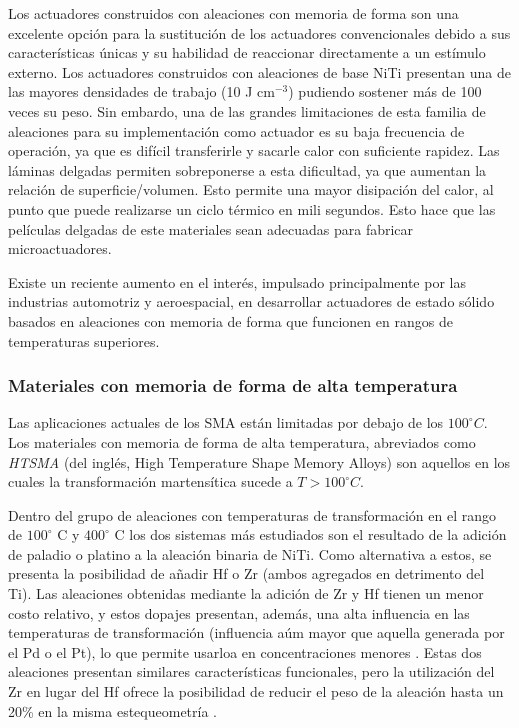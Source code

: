 \documentclass[12pt]{article}
\theoremstyle{definition}
\theoremstyle{remark}
\begin{document}
Los actuadores construidos con aleaciones con memoria de forma son una excelente opción para la sustitución de los actuadores convencionales debido a sus características únicas y su habilidad de reaccionar directamente a un estímulo externo. Los actuadores construidos con aleaciones de base NiTi presentan una de las mayores densidades de trabajo (10 J cm$^{-3}$) pudiendo sostener más de 100 veces su peso. Sin embardo, una de las grandes limitaciones de esta familia de aleaciones para su implementación como actuador es su baja frecuencia de operación, ya que es difícil transferirle y sacarle calor con suficiente rapidez. Las láminas delgadas permiten sobreponerse a esta dificultad, ya que aumentan la relación de superficie/volumen. Esto permite una mayor disipación del calor, al punto que puede realizarse un ciclo térmico en mili segundos. Esto hace que las películas delgadas de este materiales sean adecuadas para fabricar microactuadores\citep{ThinFilm}.

Existe un reciente aumento en el interés, impulsado principalmente por las industrias automotriz y aeroespacial, en desarrollar actuadores de estado sólido basados en aleaciones con memoria de forma que funcionen en rangos de temperaturas superiores.

\subsubsection{Materiales con memoria de forma de alta temperatura}

Las aplicaciones actuales de los SMA están limitadas por debajo de los $100^\circ C$. Los materiales con memoria de forma de alta temperatura, abreviados como \textit{HTSMA} (del inglés, High Temperature Shape Memory Alloys) son aquellos en los cuales la transformación martensítica sucede a $T > 100^\circ C$.

Dentro del grupo de aleaciones con temperaturas de transformación en el rango de $100^\circ$ C y $400^\circ$ C los dos sistemas más estudiados son el resultado de la adición de paladio o platino a la aleación binaria de NiTi. Como alternativa a estos, se presenta la posibilidad de añadir Hf o Zr (ambos agregados en detrimento del Ti)\cite{HTSMA}. Las aleaciones obtenidas mediante la adición de Zr y Hf tienen un menor costo relativo, y estos dopajes presentan, además, una alta influencia en las temperaturas de transformación (influencia aúm mayor que aquella generada por el Pd o el Pt), lo que permite usarloa en concentraciones menores \citep{HTSMA}. Estas dos aleaciones presentan similares características funcionales, pero la utilización del Zr en lugar del Hf ofrece la posibilidad de reducir el peso de la aleación hasta un 20\% en la misma estequeometría \cite{Evirgen2013}.
\end{document}
